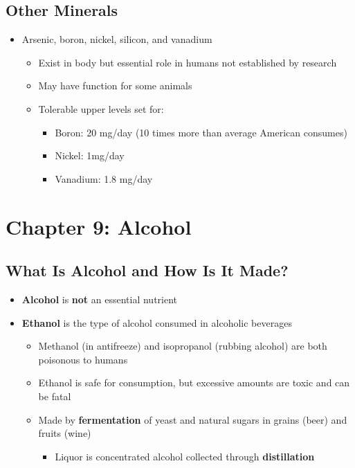 \documentclass[12pt]{article}
\begin{document}
        \subsection{Other Minerals}
            \begin{itemize}
                \item Arsenic, boron, nickel, silicon, and vanadium
                    \begin{itemize}
                        \item Exist in body but essential role in humans not established by research
                        \item May have function for some animals
                        \item Tolerable upper levels set for:
                            \begin{itemize}
                                \item Boron: 20 mg/day (10 times more than average American consumes)
                                \item Nickel: 1mg/day
                                \item Vanadium: 1.8 mg/day
                            \end{itemize}
                    \end{itemize}
            \end{itemize}

    \section{Chapter 9: Alcohol}
        
        \subsection{What Is Alcohol and How Is It Made?}
            \begin{itemize}
                \item \textbf{Alcohol} is \textbf{not} an essential nutrient
                \item \textbf{Ethanol} is the type of alcohol consumed in alcoholic beverages
                    \begin{itemize}
                        \item Methanol (in antifreeze) and isopropanol (rubbing alcohol) are both poisonous to humans
                        \item Ethanol is safe for consumption, but excessive amounts are toxic and can be fatal
                        \item Made by \textbf{fermentation} of yeast and natural sugars in grains (beer) and fruits (wine)
                            \begin{itemize}
                                \item Liquor is concentrated alcohol collected through \textbf{distillation}
                            \end{itemize}
                    \end{itemize}
            \end{itemize}
        
\end{document}
